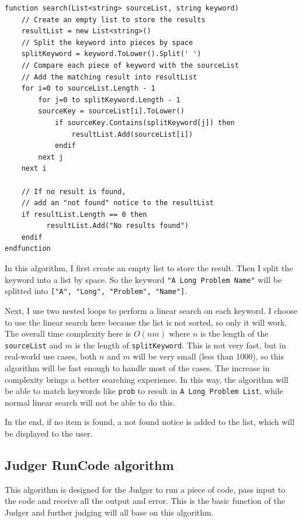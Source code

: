 \documentclass[a4paper]{report}
\begin{document}
\begin{verbatim}
function search(List<string> sourceList, string keyword)
    // Create an empty list to store the results
    resultList = new List<string>()
    // Split the keyword into pieces by space
    splitKeyword = keyword.ToLower().Split(' ')
    // Compare each piece of keyword with the sourceList
    // Add the matching result into resultList
    for i=0 to sourceList.Length - 1
        for j=0 to splitKeyword.Length - 1
        sourceKey = sourceList[i].ToLower()
            if sourceKey.Contains(splitKeyword[j]) then
                resultList.Add(sourceList[i])
            endif
        next j
    next i

    // If no result is found,
    // add an "not found" notice to the resultList
    if resultList.Length == 0 then
          resultList.Add("No results found")
    endif
endfunction
\end{verbatim}

In this algorithm, I first create an empty list to store the result. Then I split the keyword into a list by space. So the keyword \texttt{"A Long Problem Name"} will be splitted into \texttt{["A", "Long", "Problem", "Name"]}.

Next, I use two nested loops to perform a linear search on each keyword. I choose to use the linear search here because the list is not sorted, so only it will work. The overall time complexity here is $O(nm)$ where $n$ is the length of the \texttt{sourceList} and $m$ is the length of \texttt{splitKeyword}. This is not very fast, but in real-world use cases, both $n$ and $m$ will be very small (less than 1000), so this algorithm will be fast enough to handle most of the cases. The increase in complexity brings a better searching experience. In this way, the algorithm will be able to match keywords like \texttt{prob} to result in \texttt{A Long Problem List}, while normal linear search will not be able to do this.

In the end, if no item is found, a not found notice is added to the list, which will be displayed to the user.

\subsection{Judger RunCode algorithm}

This algorithm is designed for the Judger to run a piece of code, pass input to the code and receive all the output and error. This is the basic function of the Judger and further judging will all base on this algorithm.
\end{document}
